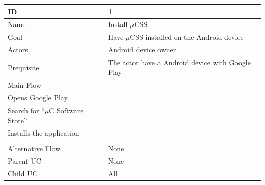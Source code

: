     \begin{table}
        \begin{tabular}{|l|l|}
            \hline
            ID               & 1                                                                                                                                  \\ \hline
            Name             & Install $\mu$CSS                                                                                                                   \\
            Goal             & Have $\mu$CSS installed on the Android device                                                                                      \\
            Actors           & Android device owner                                                                                                               \\
            Prequisite       & The actor have a Android device with Google Play                                                                                   \\
            Main Flow        & \begin{itemize} \\ \item{Opens Google Play} \\ \item{Search for ``$\mu$C Software Store''} \\ \item{Installs the application} \\ \end{itemize} \\
            Alternative Flow & None                                                                                                                               \\
            Parent UC        & None                                                                                                                               \\
            Child UC         & All                                                                                                                                \\
            \hline
        \end{tabular}
    \end{table}

